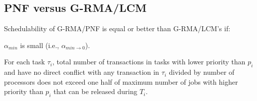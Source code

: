 \subsection{PNF versus G-RMA/LCM}\label{subsec:pnf_vs_grma_lcm}
%
\begin{clm}\label{sub:pnf_lcm_rma_comp}
%
Schedulability of G-RMA/PNF is equal or better than G-RMA/LCM's if:
\begin{compactitem}
\item $\alpha_{min}$ is small (i.e., $\alpha_{min \rightarrow 0}$).
%
\item For each task $\tau_i$, total number of transactions in tasks with lower priority than $p_{i}$ and have no direct conflict with any transaction in $\tau_i$ divided by number of processors does not exceed one half of maximum number of jobs with higher priority than $p_{i}$ that can be released during $T_{i}$.
%
\end{compactitem}
%
\end{clm}
%
